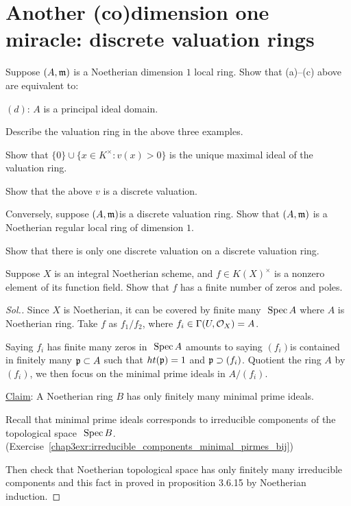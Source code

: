 \documentclass[11pt]{book} %
\begin{document}
\section{Another (co)dimension one miracle: discrete valuation rings}
\begin{exr}
Suppose $(A, {\mathfrak m})$ is a Noetherian dimension $1$ local ring. Show that (a)–(c) above are equivalent to:

$(d)$: $A$ is a principal ideal domain.
\end{exr}
\begin{exr}
Describe the valuation ring in the above three examples.
\end{exr}
\begin{exr}
Show that $\{0\}\cup\{x \in K^\times :v(x)>0\}$ is the unique maximal ideal of the valuation ring.
\end{exr}
\begin{exr}
Show that the above $v$ is a discrete valuation.
\end{exr}
\begin{exr}
 Conversely, suppose $(A,{\mathfrak m})$is a discrete valuation ring. Show that $(A, {\mathfrak m})$ is a Noetherian regular local ring of dimension $1$.
\end{exr}
\begin{exr}
Show that there is only one discrete valuation on a discrete
valuation ring.
\end{exr}
\begin{exr}
Suppose $X$ is an integral Noetherian scheme, and $f\in K(X)^\times$ is a nonzero element of its function field. Show that $f$ has a finite number of zeros and poles.
\end{exr}
\begin{proof}[Sol.]
Since $X$ is Noetherian, it can be covered by finite many  $\text{ Spec\,} A$ where $A$ is Noetherian ring. Take $f$ as $f_1/f_2$, where $f_i\in \Gamma(U,{\cal O}_X)=A$. 

Saying $f_i$ has finite many zeros in $\text{ Spec\,} A$ amounts to saying $(f_i)$is contained in finitely many ${\mathfrak p}\subset A$ such that $ht({\mathfrak p})=1$ and ${\mathfrak p}\supset (f_i)$. Quotient the ring $A$ by $(f_i)$, we then focus on the minimal prime ideals in $A/(f_i)$.

\underline{Claim}: A Noetherian ring $B$ has only finitely many minimal prime ideals.

Recall that minimal prime ideals corresponds to irreducible components of the topological space $\text{ Spec\,} B$. (Exercise~\ref{chap3exr:irreducible_components_minimal_pirmes_bij})

Then check that Noetherian topological space has only finitely many irreducible components and this fact in proved in proposition 3.6.15 by Noetherian induction.


\end{proof}
\end{document}
